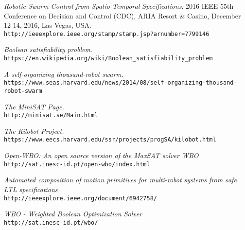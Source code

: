 \documentclass{article}[11pt]
\begin{document}
		\begin{thebibliography}{9}
			\author{Iman Haghighi, Sadra Sadraddini, and Calin Belta.}
			\textit{Robotic  Swarm  Control  from  Spatio-Temporal  Specifications}.
			2016 IEEE 55th Conference on Decision and Control (CDC), ARIA Resort \& Casino, December 12-14, 2016, Las Vegas, USA.\\
			\texttt{http://ieeexplore.ieee.org/stamp/stamp.jsp?arnumber=7799146} 			
			
			\author{Wikipedia}
			\textit{Boolean satisfiability problem}. \\
			\texttt{https://en.wikipedia.org/wiki/Boolean\_satisfiability\_problem} 
			
			\author{Caroline Perry.}
			\textit{A self-organizing thousand-robot swarm.}\\
			\texttt{https://www.seas.harvard.edu/news/2014/08/self-organizing-thousand-robot-swarm}
			
			\author{Niklas EÃ©n, Niklas SÃ¶rensson}
			\textit{The MiniSAT Page.}\\
			\texttt{http://minisat.se/Main.html}

			\author{Self Organizing Systems Research Group.}
			\textit{The Kilobot Project.}\\
			\texttt{https://www.eecs.harvard.edu/ssr/projects/progSA/kilobot.html}

			\author{Ruben Martins, Vasco Manquinho, Inês Lynce.}
			\textit{Open-WBO: An open source version of the MaxSAT solver WBO}\\
			\texttt{http://sat.inesc-id.pt/open-wbo/index.html}

			\author{Indranil Saha, Rattanachai Ramaithitima, Vijay Kumar}
			\textit{Automated composition of motion primitives for multi-robot systems from safe LTL specifications}\\
			\texttt{http://ieeexplore.ieee.org/document/6942758/}

			\author{Vasco Manquinho, Ruben Martins, Inês Lynce, João Marques-Silva, Jordi Planes}
			\textit{WBO - Weighted Boolean Optimization Solver}\\
			\texttt{http://sat.inesc-id.pt/wbo/}
		\end{thebibliography}
\end{document}
